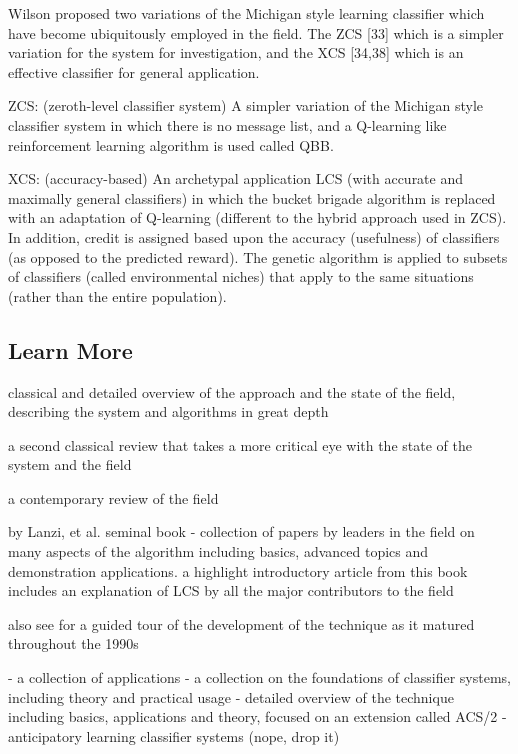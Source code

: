 \documentclass[a4paper, 11pt]{article}
\begin{document}
Wilson proposed two variations of the Michigan style learning classifier which have become ubiquitously employed in the field. The ZCS [33] which is a simpler variation for the system for investigation, and the XCS [34,38] which is an effective classifier for general application.

ZCS: (zeroth-level classifier system) A simpler variation of the Michigan style classifier system in which there is no message list, and a Q-learning like reinforcement learning algorithm is used called QBB. \cite{Wilson1994}

XCS: (accuracy-based) An archetypal application LCS (with accurate and maximally general classifiers) in which the bucket brigade algorithm is replaced with an adaptation of Q-learning (different to the hybrid approach used in ZCS). In addition, credit is assigned based upon the accuracy (usefulness) of classifiers (as opposed to the predicted reward). The genetic algorithm is applied to subsets of classifiers (called environmental niches) that apply to the same situations (rather than the entire population). \cite{Wilson1995}


% 
% 
\subsection{Learn More}

classical and detailed overview of the approach and the state of the field, describing the system and algorithms in great depth \cite{Booker1989}

a second classical review that takes a more critical eye with the state of the system and the field \cite{Wilson1989}

a contemporary review of the field \cite{Holmes2002}

by Lanzi, et al.
seminal book \cite{Lanzi2000} - collection of papers by leaders in the field on many aspects of the algorithm including basics, advanced topics and demonstration applications.
a highlight introductory article from this book includes an explanation of LCS by all the major contributors to the field \cite{Holland2000}

also see for a guided tour of the development of the technique as it matured throughout the 1990s \cite{Lanzi2000a}


\cite{Bull2004} - a collection of applications 
\cite{Bull2005} - a collection on the foundations of classifier systems, including theory and practical usage
\cite{Butz2002} - detailed overview of the technique including basics, applications and theory, focused on an extension called ACS/2 - anticipatory learning classifier systems (nope, drop it)
\end{document}
